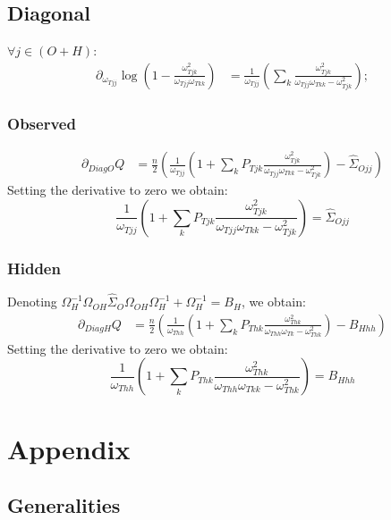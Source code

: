 \documentclass[11pt,a4paper]{article}
\begin{document}
\subsection{Diagonal}
$\forall j \in (O+H)$:
\begin{align*}
\partial_{\omega_{Tjj}}\log\left(1-\frac{\omega_{Tjk}^2}{\omega_{Tjj}\omega_{Tkk}}\right) &= \frac{1}{\omega_{Tjj}}\left( \sum_{k} \frac{\omega_{Tjk} ^2}{\omega_{Tjj}\omega_{Tkk} - \omega_{Tjk} ^2}  \right);
\end{align*}
\subsubsection{Observed}
\begin{align*}
\partial_{DiagO}Q &= \frac{n}{2}\left( \frac{1}{\omega_{Tjj}}\left( 1 + \sum_{k} P_{Tjk} \frac{\omega_{Tjk} ^2}{\omega_{Tjj}\omega_{Tkk} - \omega_{Tjk} ^2}  \right) - \widehat{\Sigma}_{Ojj}\right)
\end{align*}
Setting the derivative to zero we obtain:
$$ \frac{1}{\omega_{Tjj}}\left( 1 + \sum_{k} P_{Tjk} \frac{\omega_{Tjk} ^2}{\omega_{Tjj}\omega_{Tkk} - \omega_{Tjk} ^2}  \right) =\widehat{\Sigma}_{Ojj}$$

\subsubsection{Hidden}
Denoting $\Omega_{H}^{-1}\Omega_{OH}\widehat{\Sigma}_O\Omega_{OH}\Omega_{H}^{-1} + \Omega_{H}^{-1} = B_H $, we obtain:
\begin{align*}
\partial_{DiagH}Q &= \frac{n}{2}\left( \frac{1}{\omega_{Thh}}\left( 1 + \sum_{k} P_{Thk} \frac{\omega_{Thk} ^2}{\omega_{Thh}\omega_{Tk} - \omega_{Thk} ^2}  \right) -B_{Hhh}\right)
\end{align*}
Setting the derivative to zero we obtain:
$$ \frac{1}{\omega_{Thh}}\left( 1 + \sum_{k} P_{Thk} \frac{\omega_{Thk} ^2}{\omega_{Thh}\omega_{Tkk} - \omega_{Thk} ^2}  \right) =B_{Hhh}  $$


\newpage
\section{Appendix}

\subsection{Generalities}
\end{document}
